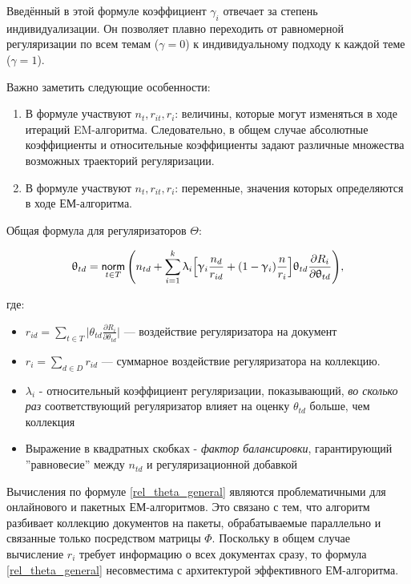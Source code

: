 Введённый в этой формуле коэффициент $\gamma_i$ отвечает за степень индивидуализации. Он позволяет плавно переходить от равномерной регуляризации по всем темам ($\gamma = 0$) к индивидуальному подходу к каждой теме ($\gamma = 1$).

Важно заметить следующие особенности: 
\begin{enumerate}
    \item {В формуле участвуют $n_t, r_{it}, r_{i}$:  величины, которые могут изменяться в ходе итераций EM-алгоритма. Следовательно, в общем случае
    абсолютные коэффициенты и относительные  коэффициенты задают различные множества возможных траекторий регуляризации.}
    \item  {В формуле участвуют $n_t, r_{it}, r_{i}$: переменные, значения которых определяются в ходе ЕМ-алгоритма.}
\end{enumerate}

Общая формула для регуляризаторов $\Theta$:

\[
\uptheta_{td} = \mathop{\mathsf{norm}}\limits_{t \in T} \Bigg( 
    n_{td} + \sum_{i=1}^k \uplambda_i \Big[
        \upgamma_i \frac{n_d}{r_{id}} + (1-\upgamma_i)\frac{n}{r_i}
        \Big] 
    \uptheta_{td} \frac{\partial R_i}{\partial \uptheta_{td}}
\Bigg), \label{rel_theta_general}
\]

где: 
\begin{itemize}
    \item { $r_{id} = \sum_{t\in T} \Big | \theta_{td} \frac{\partial R_i}{\partial \theta_{td}} \Big | $ --- воздействие регуляризатора на документ}
    \item { $r_{i} = \sum_{d\in D} r_{id}$ --- суммарное воздействие регуляризатора на коллекцию.}
    \item { $\lambda_i$ - относительный коэффициент регуляризации, показывающий, \emph{во сколько раз} соответствующий регуляризатор влияет на оценку $\theta_{td}$ больше, чем коллекция}
    \item {Выражение в квадратных скобках - \textit{фактор балансировки}, гарантирующий ''равновесие'' между $n_{td}$ и регуляризационной добавкой}
\end{itemize}

Вычисления по формуле \ref{rel_theta_general} являются проблематичными для онлайнового и пакетных ЕМ-алгоритмов. Это связано с тем, что алгоритм разбивает коллекцию документов на пакеты, обрабатываемые параллельно и связанные только посредством матрицы $\Phi$. Поскольку в общем случае вычисление $r_i$ требует информацию о всех документах сразу, то формула \ref{rel_theta_general} несовместима с архитектурой эффективного ЕМ-алгоритма.

